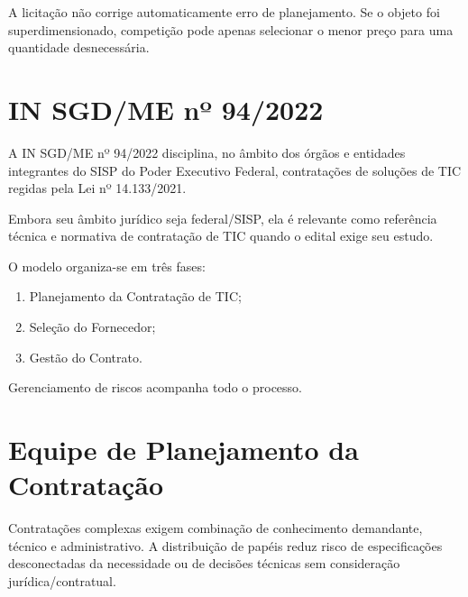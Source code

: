A licitação não corrige automaticamente erro de planejamento. Se o objeto foi superdimensionado, competição pode apenas selecionar o menor preço para uma quantidade desnecessária.

\section{IN SGD/ME nº 94/2022}

A IN SGD/ME nº 94/2022 disciplina, no âmbito dos órgãos e entidades integrantes do SISP do Poder Executivo Federal, contratações de soluções de TIC regidas pela Lei nº 14.133/2021.

Embora seu âmbito jurídico seja federal/SISP, ela é relevante como referência técnica e normativa de contratação de TIC quando o edital exige seu estudo.

O modelo organiza-se em três fases:
\begin{enumerate}
\item Planejamento da Contratação de TIC;
\item Seleção do Fornecedor;
\item Gestão do Contrato.
\end{enumerate}

Gerenciamento de riscos acompanha todo o processo.

\begin{center}
\end{center}

\section{Equipe de Planejamento da Contratação}

Contratações complexas exigem combinação de conhecimento demandante, técnico e administrativo. A distribuição de papéis reduz risco de especificações desconectadas da necessidade ou de decisões técnicas sem consideração jurídica/contratual.

